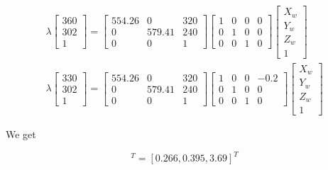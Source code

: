 \documentclass[12pt]{article}
\begin{document}
\begin{align}
	\lambda 
	\begin{bmatrix}
		360 \\
		302 \\
		1
	\end{bmatrix}
	= 
	\begin{bmatrix}
		554.26 		& 0			& 320 \\
		0			& 579.41 	& 240 \\
		0			& 0			& 1
	\end{bmatrix}
	\begin{bmatrix}
		1	&	0	& 	0	&	0 \\
		0	&	1	&	0	&	0 \\
		0	&	0	&	1	&	0 
	\end{bmatrix}
	\begin{bmatrix}
		X_w \\
		Y_w \\
		Z_w \\
		1
	\end{bmatrix} \\
	\lambda 
	\begin{bmatrix}
		330 \\
		302 \\
		1
	\end{bmatrix}
	= 
	\begin{bmatrix}
		554.26 		& 0			& 320 \\
		0			& 579.41 	& 240 \\
		0			& 0			& 1
	\end{bmatrix}
	\begin{bmatrix}
		1	&	0	& 	0	&	-0.2 \\
		0	&	1	&	0	&	0 \\
		0	&	0	&	1	&	0 
	\end{bmatrix}
	\begin{bmatrix}
		X_w \\
		Y_w \\
		Z_w \\
		1
	\end{bmatrix}
\end{align}

\noindent We get 

\begin{equation}
	[X_w, Y_w, Z_w]^T = [0.266, 0.395, 3.69]^T
\end{equation}
\end{document}
